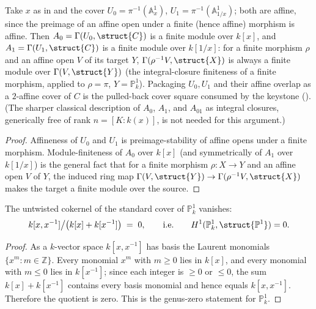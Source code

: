 \begin{proposition}
  \label{thm:adelic_chart_finite_over_P1}
  \leanok
  Take \(x\) as in  and the
  cover \(U_0 = \pi^{-1}(\mathbb{A}^1_x)\),
  \(U_1 = \pi^{-1}(\mathbb{A}^1_{1/x})\); both are affine, since the
  preimage of an affine open under a finite (hence affine) morphism is
  affine. Then \(A_0 = \Gamma(U_0, \struct{C})\) is a finite module over
  \(k[x]\), and \(A_1 = \Gamma(U_1, \struct{C})\) is a finite module over
  \(k[1/x]\): for a finite morphism \(\rho\) and an affine open \(V\) of
  its target \(Y\), \(\Gamma(\rho^{-1}V, \struct{X})\) is always a finite
  module over \(\Gamma(V, \struct{Y})\) (the integral-closure finiteness
  of a finite morphism, applied to \(\rho = \pi\), \(Y = \mathbb{P}^1_k\)).
  Packaging \(U_0, U_1\) and their affine overlap as a
  \(2\)-affine cover of \(C\) is the pulled-back cover square consumed by
  the keystone (). (The
  sharper classical description of \(A_0\), \(A_1\), and \(A_{01}\) as
  integral closures, generically free of rank \(n=[K:k(x)]\), is not
  needed for this argument.)
\end{proposition}
\begin{proof}
  \leanok
  Affineness of \(U_0\) and \(U_1\) is preimage-stability of affine opens
  under a finite morphism. Module-finiteness of \(A_0\) over \(k[x]\)
  (and symmetrically of \(A_1\) over \(k[1/x]\)) is the general fact that
  for a finite morphism \(\rho \colon X \to Y\) and an affine open \(V\)
  of \(Y\), the induced ring map \(\Gamma(V, \struct{Y}) \to
  \Gamma(\rho^{-1}V, \struct{X})\) makes the target a finite module over
  the source.
\end{proof}
\begin{lemma}
  \label{thm:adelic_cokernel_P1_zero}
  \leanok
  The untwisted cokernel of the standard cover of \(\mathbb{P}^1_k\)
  vanishes:
  \[
    k[x, x^{-1}] \big/ \bigl(k[x] + k[x^{-1}]\bigr) \;=\; 0,
    \qquad\text{i.e.}\qquad H^1(\mathbb{P}^1_k, \struct{\mathbb{P}^1}) = 0.
  \]
\end{lemma}
\begin{proof}
  \leanok
  As a \(k\)-vector space \(k[x, x^{-1}]\) has basis the Laurent
  monomials \(\{x^m : m \in \mathbb{Z}\}\). Every monomial \(x^m\) with
  \(m \ge 0\) lies in \(k[x]\), and every monomial with \(m \le 0\) lies
  in \(k[x^{-1}]\); since each integer is \(\ge 0\) or \(\le 0\), the sum
  \(k[x] + k[x^{-1}]\) contains every basis monomial and hence equals
  \(k[x, x^{-1}]\). Therefore the quotient is zero. This is the genus-zero
  statement for \(\mathbb{P}^1_k\).
\end{proof}

